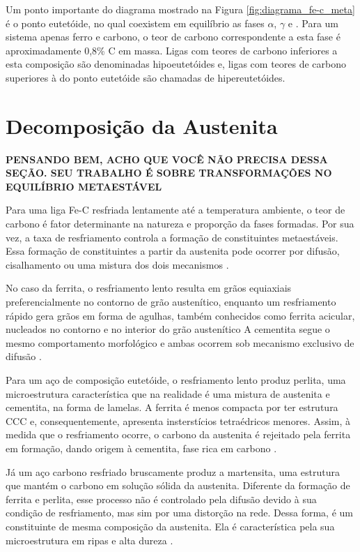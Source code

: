 \documentclass[brazil,tf,epusp]{usp}  %
\begin{document}
Um ponto importante do diagrama mostrado na Figura \ref{fig:diagrama_fe-c_meta} é o ponto eutetóide, no qual coexistem em equilíbrio as fases $\alpha$, $\gamma$ e . Para um sistema apenas ferro e carbono, o teor de carbono correspondente a esta fase é aproximadamente 0,8\% C em massa. Ligas com teores de carbono inferiores a esta composição são denominadas hipoeutetóides e, ligas com teores de carbono superiores à do ponto eutetóide são chamadas de hipereutetóides.

\section{Decomposição da Austenita}

\textbf{PENSANDO BEM, ACHO QUE VOCÊ NÃO PRECISA DESSA SEÇÃO. SEU TRABALHO É SOBRE TRANSFORMAÇÕES NO EQUILÍBRIO METAESTÁVEL}

Para uma liga Fe-C resfriada lentamente até a temperatura ambiente, o teor de carbono é fator determinante na natureza e proporção da fases formadas. Por sua vez, a taxa de resfriamento controla a formação de constituintes metaestáveis. Essa formação de constituintes a partir da austenita pode ocorrer por difusão, cisalhamento ou uma mistura dos dois mecanismos \cite{Honeycombe1982}.

No caso da ferrita, o resfriamento lento resulta em grãos equiaxiais preferencialmente no contorno de grão austenítico, enquanto um resfriamento rápido gera grãos em forma de agulhas, também conhecidos como ferrita acicular, nucleados no contorno e no interior do grão austenítico \cite{Silva2010} %
A cementita segue o mesmo comportamento morfológico e ambas ocorrem sob mecanismo exclusivo de difusão \cite{Honeycombe1982}.

Para um aço de composição eutetóide, o resfriamento lento produz perlita, uma microestrutura característica que na realidade é uma mistura de austenita e cementita, na forma de lamelas. A ferrita é menos compacta por ter estrutura CCC e, consequentemente, apresenta insterstícios tetraédricos menores. Assim, à medida que o resfriamento ocorre, o carbono da austenita é rejeitado pela ferrita em formação, dando origem à cementita, fase rica em carbono \cite{Silva2010}.

Já um aço carbono resfriado bruscamente produz a martensita, uma estrutura que mantém o carbono em solução sólida da austenita. Diferente da formação de ferrita e perlita, esse processo não é controlado pela difusão devido à sua condição de resfriamento, mas sim por uma distorção na rede. Dessa forma, é um constituinte de mesma composição da austenita. Ela é característica pela sua microestrutura em ripas e alta dureza \cite{Honeycombe1982}.
\end{document}
